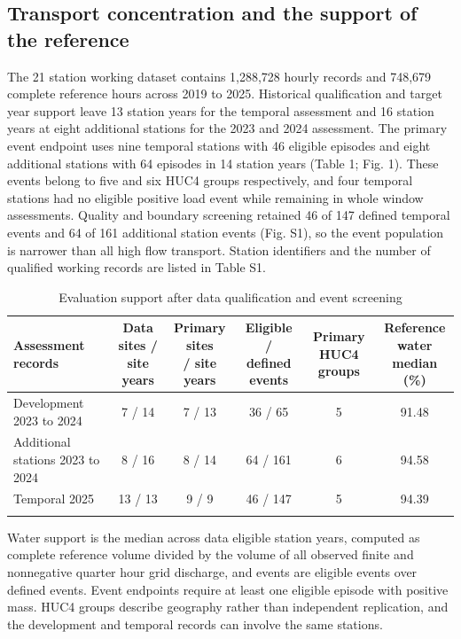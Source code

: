 \documentclass[lineno,pdflatex,sn-apa]{sn-jnl}%
\theoremstyle{thmstyleone}%
\theoremstyle{thmstyletwo}%
\theoremstyle{thmstylethree}%
\begin{document}
\subsection{Transport concentration and the support of the reference}

The 21 station working dataset contains 1,288,728 hourly records and 748,679 complete reference hours across 2019 to 2025. Historical qualification and target year support leave 13 station years for the temporal assessment and 16 station years at eight additional stations for the 2023 and 2024 assessment. The primary event endpoint uses nine temporal stations with 46 eligible episodes and eight additional stations with 64 episodes in 14 station years (Table 1; Fig. 1). These events belong to five and six HUC4 groups respectively, and four temporal stations had no eligible positive load event while remaining in whole window assessments. Quality and boundary screening retained 46 of 147 defined temporal events and 64 of 161 additional station events (Fig. S1), so the event population is narrower than all high flow transport. Station identifiers and the number of qualified working records are listed in Table S1.

\begin{table}[htbp]
\caption{Evaluation support after data qualification and event screening}\label{tab:1}
\footnotesize
\setlength{\tabcolsep}{2pt}
\begin{tabular}{@{}lccccc@{}}
\toprule
\shortstack{Assessment\\records} & \shortstack{Data sites /\\site years} & \shortstack{Primary sites\\/ site years} & \shortstack{Eligible /\\defined events} & \shortstack{Primary HUC4\\groups} & \shortstack{Reference\\water median\\(\%)}\\
\midrule
Development 2023 to 2024 & 7 / 14 & 7 / 13 & 36 / 65 & 5 & 91.48\\
Additional stations 2023 to 2024 & 8 / 16 & 8 / 14 & 64 / 161 & 6 & 94.58\\
Temporal 2025 & 13 / 13 & 9 / 9 & 46 / 147 & 5 & 94.39\\
\botrule
\end{tabular}
\end{table}

Water support is the median across data eligible station years, computed as complete reference volume divided by the volume of all observed finite and nonnegative quarter hour grid discharge, and events are eligible events over defined events. Event endpoints require at least one eligible episode with positive mass. HUC4 groups describe geography rather than independent replication, and the development and temporal records can involve the same stations.
\end{document}
